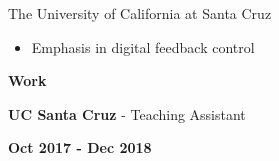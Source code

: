 \documentclass[paper=a4,fontsize=11pt]{article} %
\def \sectionSpace      {0.7cm}     %
\def \leftColSpace      {0.12}      %
\def \middleColSpace    {0.675}     %
\def \bigMiddleColSpace {0.875}     %
\def \rightColSpace     {0.25}      %
\begin{document}
    \noindent
    \begin{minipage}[t]{\leftColSpace\linewidth}
        \hfill
    \end{minipage}
    \begin{minipage}[t]{\bigMiddleColSpace\linewidth}
        \noindent The University of California at Santa Cruz
        \begin{itemize}[noitemsep,topsep=0pt]
            \item Emphasis in digital feedback control
        \end{itemize}
    \end{minipage}

    \vspace{\sectionSpace}
    \noindent
    \begin{minipage}[t]{\leftColSpace\linewidth}
        \noindent \textbf{Work}
    \end{minipage}
    \begin{minipage}[t]{\middleColSpace\linewidth}
        \noindent \textbf{UC Santa Cruz} - Teaching Assistant
    \end{minipage}
    \begin{minipage}[t]{\rightColSpace\linewidth}
        \noindent \textbf{Oct 2017 - Dec 2018}
    \end{minipage}
\end{document}
